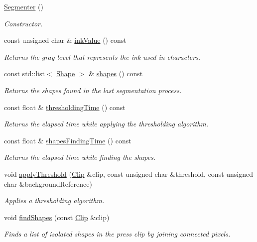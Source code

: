 \begin{CompactItemize}
\item 
\hyperlink{class_segmenter_d39ec3bda31be180820aa0bdca7b125d}{Segmenter} ()
\begin{CompactList}\small\item\em Constructor. \item\end{CompactList}\item 
const unsigned char \& \hyperlink{class_segmenter_e9bc56ddcbe5ea4abb40fcc85e3d9fbe}{inkValue} () const 
\begin{CompactList}\small\item\em Returns the gray level that represents the ink used in characters. \item\end{CompactList}\item 
const std::list$<$ \hyperlink{class_shape}{Shape} $>$ \& \hyperlink{class_segmenter_7ddded12f26e94e6f5cba2752d2c4142}{shapes} () const 
\begin{CompactList}\small\item\em Returns the shapes found in the last segmentation process. \item\end{CompactList}\item 
const float \& \hyperlink{class_segmenter_9114d0f3934b43478fb55077b7722d3d}{thresholdingTime} () const 
\begin{CompactList}\small\item\em Returns the elapsed time while applying the thresholding algorithm. \item\end{CompactList}\item 
const float \& \hyperlink{class_segmenter_8d7304b35b1891b1c7154a3ac2ff2c4b}{shapesFindingTime} () const 
\begin{CompactList}\small\item\em Returns the elapsed time while finding the shapes. \item\end{CompactList}\item 
void \hyperlink{class_segmenter_6854315e3320f9d9a8ece14cbb8570ee}{applyThreshold} (\hyperlink{class_clip}{Clip} \&clip, const unsigned char \&threshold, const unsigned char \&backgroundReference)
\begin{CompactList}\small\item\em Applies a thresholding algorithm. \item\end{CompactList}\item 
void \hyperlink{class_segmenter_465c8e755bb56d247add080a04377520}{findShapes} (const \hyperlink{class_clip}{Clip} \&clip)
\begin{CompactList}\small\item\em Finds a list of isolated shapes in the press clip by joining connected pixels. \item\end{CompactList}\end{CompactItemize}
